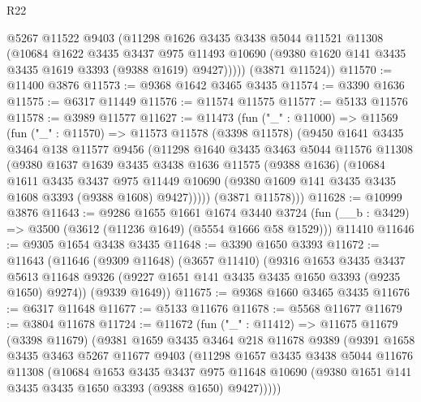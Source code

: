 \begin{lexlean}{R22}
\begin{coremodule}
          @5267
          @11522
          @9403
          (@11298
            @1626
            @3435
            @3438
            @5044
            @11521
            @11308
            (@10684
              @1622
              @3435
              @3437
              @975
              @11493
              @10690
              (@9380 @1620 @141 @3435 @3435 @1619 @3393 (@9388 @1619) @9427)))))
      (@3871 @11524))
@11570 := @11400 @3876
@11573 := @9368 @1642 @3465 @3435
@11574 := @3390 @1636
@11575 := @6317 @11449
@11576 := @11574 @11575
@11577 := @5133 @11576
@11578 := @3989 @11577
@11627 := @11473
    (fun ("_" : @11000) =>
    @11569
      (fun ("_" : @11570) =>
      @11573
        @11578
        (@3398 @11578)
        (@9450
          @1641
          @3435
          @3464
          @138
          @11577
          @9456
          (@11298
            @1640
            @3435
            @3463
            @5044
            @11576
            @11308
            (@9380
              @1637
              @1639
              @3435
              @3438
              @1636
              @11575
              (@9388 @1636)
              (@10684
                @1611
                @3435
                @3437
                @975
                @11449
                @10690
                (@9380 @1609 @141 @3435 @3435 @1608 @3393 (@9388 @1608) @9427)))))
        (@3871 @11578)))
@11628 := @10999 @3876
@11643 := @9286
    @1655
    @1661
    @1674
    @3440
    @3724
    (fun (__b : @3429) => @3500 (@3612 (@11236 @1649) (@5554 @1666 @58 @1529)))
    @11410
@11646 := @9305 @1654 @3438 @3435
@11648 := @3390 @1650 @3393
@11672 := @11643
    (@11646
      (@9309 @11648)
      (@3657 @11410)
      (@9316
        @1653
        @3435
        @3437
        @5613
        @11648
        @9326
        (@9227 @1651 @141 @3435 @3435 @1650 @3393 (@9235 @1650) @9274))
      (@9339 @1649))
@11675 := @9368 @1660 @3465 @3435
@11676 := @6317 @11648
@11677 := @5133 @11676
@11678 := @5568 @11677
@11679 := @3804 @11678
@11724 := @11672
    (fun ("_" : @11412) =>
    @11675
      @11679
      (@3398 @11679)
      (@9381
        @1659
        @3435
        @3464
        @218
        @11678
        @9389
        (@9391
          @1658
          @3435
          @3463
          @5267
          @11677
          @9403
          (@11298
            @1657
            @3435
            @3438
            @5044
            @11676
            @11308
            (@10684
              @1653
              @3435
              @3437
              @975
              @11648
              @10690
              (@9380 @1651 @141 @3435 @3435 @1650 @3393 (@9388 @1650) @9427)))))

\end{coremodule}
\end{lexlean}

